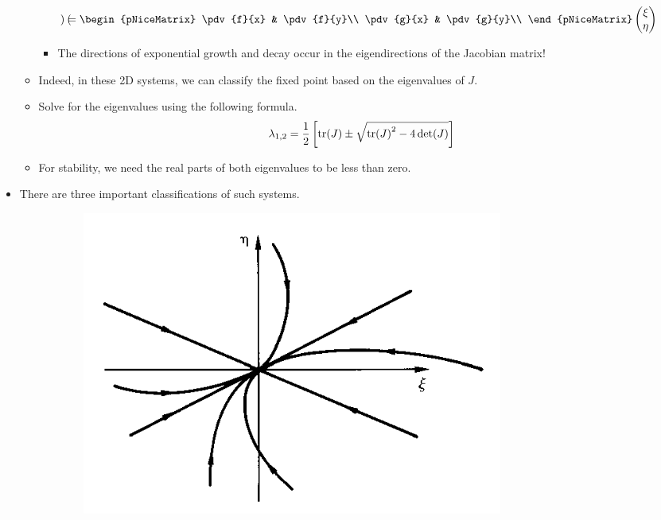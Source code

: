 \documentclass[../notes.tex]{subfiles}
\begin{document}
\begin{itemize}
\begin{itemize}
\begin{equation*}
\begin{pmatrix}
            \end{pmatrix}
            =
            \begin{pNiceMatrix}
                \pdv{f}{x} & \pdv{f}{y}\\
                \pdv{g}{x} & \pdv{g}{y}\\
            \end{pNiceMatrix}
            \begin{pmatrix}
                \xi\\
                \eta\\
            \end{pmatrix}
        \end{equation*}
        \begin{itemize}
            \item The directions of exponential growth and decay occur in the eigendirections of the Jacobian matrix!
        \end{itemize}
        \item Indeed, in these 2D systems, we can classify the fixed point based on the eigenvalues of $J$.
        \item Solve for the eigenvalues using the following formula.
        \begin{equation*}
            \lambda_{1,2} = \frac{1}{2}\left[ \tr(J)\pm\sqrt{\tr(J)^2-4\det(J)} \right]
        \end{equation*}
        \item For stability, we need the real parts of both eigenvalues to be less than zero.
    \end{itemize}
    \item There are three important classifications of such systems.
    \begin{figure}[h!]
        \centering
        \begin{subfigure}[b]{0.24\linewidth}
            \centering
            \includegraphics[width=0.95\linewidth]{../ExtFiles/classifyFixedPointsa.png}

\end{subfigure}
\end{figure}
\end{itemize}
\end{document}
